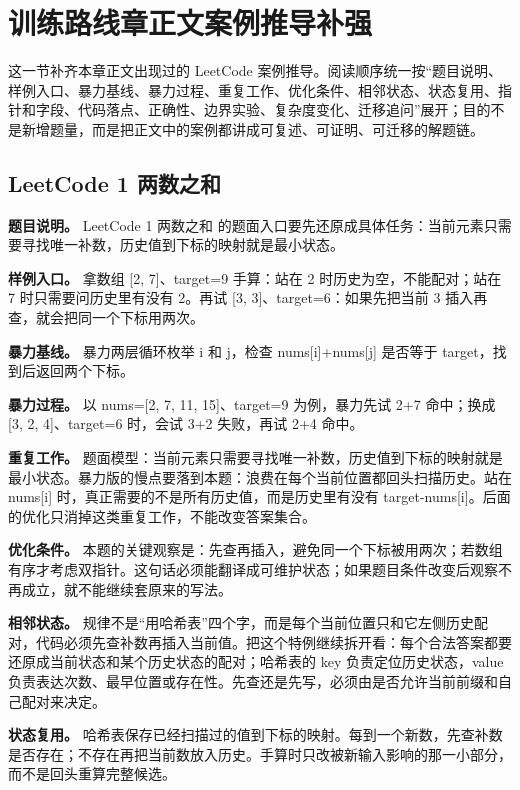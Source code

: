 \section{训练路线章正文案例推导补强}

这一节补齐本章正文出现过的 LeetCode 案例推导。阅读顺序统一按“题目说明、样例入口、暴力基线、暴力过程、重复工作、优化条件、相邻状态、状态复用、指针和字段、代码落点、正确性、边界实验、复杂度变化、迁移追问”展开；目的不是新增题量，而是把正文中的案例都讲成可复述、可证明、可迁移的解题链。

\subsection{LeetCode 1 两数之和}

\textbf{题目说明。} LeetCode 1 两数之和 的题面入口要先还原成具体任务：当前元素只需要寻找唯一补数，历史值到下标的映射就是最小状态。

\textbf{样例入口。} 拿数组 [2, 7]、target=9 手算：站在 2 时历史为空，不能配对；站在 7 时只需要问历史里有没有 2。再试 [3, 3]、target=6：如果先把当前 3 插入再查，就会把同一个下标用两次。

\textbf{暴力基线。} 暴力两层循环枚举 i 和 j，检查 nums[i]+nums[j] 是否等于 target，找到后返回两个下标。

\textbf{暴力过程。} 以 nums=[2, 7, 11, 15]、target=9 为例，暴力先试 2+7 命中；换成 [3, 2, 4]、target=6 时，会试 3+2 失败，再试 2+4 命中。

\textbf{重复工作。} 题面模型：当前元素只需要寻找唯一补数，历史值到下标的映射就是最小状态。暴力版的慢点要落到本题：浪费在每个当前位置都回头扫描历史。站在 nums[i] 时，真正需要的不是所有历史值，而是历史里有没有 target-nums[i]。后面的优化只消掉这类重复工作，不能改变答案集合。

\textbf{优化条件。} 本题的关键观察是：先查再插入，避免同一个下标被用两次；若数组有序才考虑双指针。这句话必须能翻译成可维护状态；如果题目条件改变后观察不再成立，就不能继续套原来的写法。

\textbf{相邻状态。} 规律不是“用哈希表”四个字，而是每个当前位置只和它左侧历史配对，代码必须先查补数再插入当前值。把这个特例继续拆开看：每个合法答案都要还原成当前状态和某个历史状态的配对；哈希表的 key 负责定位历史状态，value 负责表达次数、最早位置或存在性。先查还是先写，必须由是否允许当前前缀和自己配对来决定。

\textbf{状态复用。} 哈希表保存已经扫描过的值到下标的映射。每到一个新数，先查补数是否存在；不存在再把当前数放入历史。手算时只改被新输入影响的那一小部分，而不是回头重算完整候选。

